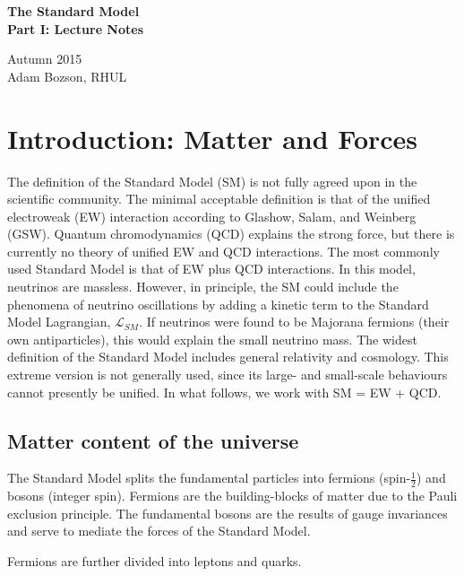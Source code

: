\documentclass{report}
\begin{document}
\begin{titlepage}
\phantom{\,}
\vfill
\centering
{\huge\textbf{The Standard Model}}\\
\vspace{\parskip}
{\Large\textbf{Part I: Lecture Notes}}

Autumn 2015\\
Adam Bozson, RHUL
\vspace{5em}
\vfill
\end{titlepage}


\tableofcontents

\chapter{Introduction: Matter and Forces}
The definition of the Standard Model (SM) is not fully agreed upon in the scientific community. The minimal acceptable definition is that of the unified electroweak (EW) interaction according to Glashow, Salam, and Weinberg (GSW). Quantum chromodynamics (QCD) explains the strong force, but there is currently no theory of unified EW and QCD interactions. The most commonly used Standard Model is that of EW plus QCD interactions. In this model, neutrinos are massless. However, in principle, the SM could include the phenomena of neutrino oscillations by adding a kinetic term to the Standard Model Lagrangian, $\mathcal{L}_{SM}$. If neutrinos were found to be Majorana fermions (their own antiparticles), this would explain the small neutrino mass. The widest definition of the Standard Model includes general relativity and cosmology. This extreme version is not generally used, since its large- and small-scale behaviours cannot presently be unified. In what follows, we work with SM = EW + QCD.

\section{Matter content of the universe}
The Standard Model splits the fundamental particles into fermions (spin-$\frac{1}{2}$) and bosons (integer spin). Fermions are the building-blocks of matter due to the Pauli exclusion principle. The fundamental bosons are the results of gauge invariances and serve to mediate the forces of the Standard Model.

Fermions are further divided into leptons and quarks.
\end{document}
